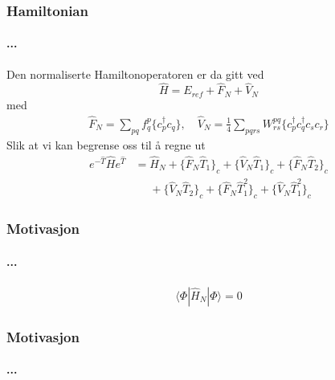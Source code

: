 \documentclass[norsk,a4paper,12pt]{beamer}
\begin{document}
  \begin{frame}
    \frametitle{Hamiltonian}
    \framesubtitle{...}
    Den normaliserte Hamiltonoperatoren er da gitt ved
    \begin{equation*}
    \hat{H}=E_{ref}+\hat{F}_N+\hat{V}_N
    \end{equation*}
    med
    \begin{align*}
    \hat{F}_N=\sum_{pq}f_q^p\{c_p^{\dagger}c_q\},\quad \hat{V}_N=\frac{1}{4}\sum_{pqrs}W_{rs}^{pq}\{c_p^{\dagger}c_q^{\dagger}c_sc_r\}
    \end{align*}
    Slik at vi kan begrense oss til å regne ut 
    \begin{align*}
    e^{-\hat{T}}\hat{H}e^{\hat{T}}&=\hat{H}_N+\{\hat{F}_N\hat{T}_1\}_c+\{\hat{V}_N\hat{T}_1\}_c+\{\hat{F}_N\hat{T}_2\}_c\\
    &\mathrel{\phantom{=}}+\{\hat{V}_N\hat{T}_2\}_c+\{\hat{F}_N\hat{T}_1^2\}_c+\{\hat{V}_N\hat{T}_1^2\}_c
    \end{align*}
  \end{frame}
  \begin{frame}
    \frametitle{Motivasjon}
    \framesubtitle{...}
    \begin{align*}
    \langle\Phi|\hat{H}_N|\Phi\rangle=0
    \end{align*}
    
  \end{frame}
  \begin{frame}
    \frametitle{Motivasjon}
    \framesubtitle{...}
    
  \end{frame}
  
\end{document}

